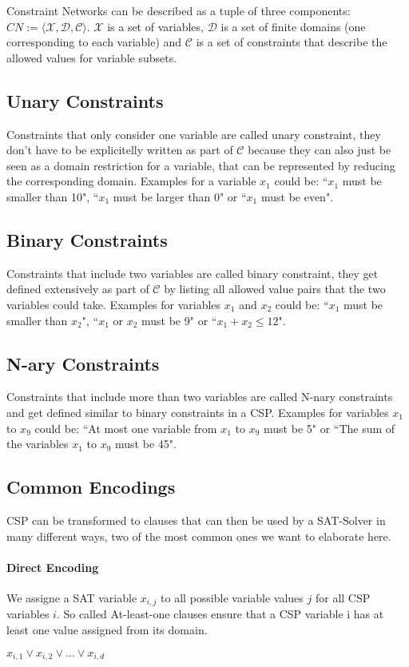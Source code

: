 Constraint Networks can be described as a tuple of three components: $CN := \langle \mathcal{X},  \mathcal{D},  \mathcal{C}\rangle$.
$\mathcal{X}$ is a set of variables, $\mathcal{D}$ is a set of finite domains (one corresponding to each variable) and $\mathcal{C}$ is a set of constraints that describe the allowed values for variable subsets.

\subsection{Unary Constraints}
Constraints that only consider one variable are called unary constraint, they don't have to be explicitelly written as part of $\mathcal{C}$ because they can also just be seen as a domain restriction for a variable, that can be represented by reducing the corresponding domain. Examples for a variable $x_1$ could be: ``$x_1$ must be smaller than 10", ``$x_1$ must be larger than 0" or ``$x_1$ must be even".

\subsection{Binary Constraints}
Constraints that include two variables are called binary constraint, they get defined extensively as part of $\mathcal{C}$ by listing all allowed value pairs that the two variables could take. Examples for variables $x_1$ and $x_2$ could be: ``$x_1$ must be smaller than $x_2$", ``$x_1$ or $x_2$ must be 9" or ``$x_1 + x_2 \leq 12$".

\subsection{N-ary Constraints}
Constraints that include more than two variables are called N-nary constraints and get defined similar to binary constraints in a CSP. Examples for variables $x_1$ to $x_9$ could be: ``At most one variable from $x_1$ to $x_9$ must be 5" or ``The sum of the variables $x_1$ to $x_9$ must be 45".

\subsection{Common Encodings}
CSP can be transformed to clauses that can then be used by a SAT-Solver in many different ways, two of the most common ones we want to elaborate here.

\paragraph{Direct Encoding \cite{walsh2000SATvCSP}\cite{gent20002ArcConsistencyInSAT}}
We assigne a SAT variable $x_{i,j}$ to all possible variable values $j$ for all CSP variables $i$. So called At-least-one clauses ensure that a CSP variable i has at least one value assigned from its domain.
\begin{center}
    $x_{i,1} \lor x_{i,2} \lor ... \lor x_{i,d}$
\end{center}

